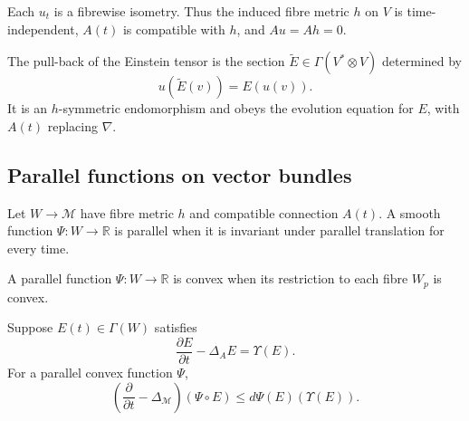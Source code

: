 \begin{remark}
\label{topping-ch9-uhlenbeck-metric}
Each \(u_t\) is a fibrewise isometry. Thus the induced fibre metric \(h\) on
\(V\) is time-independent, \(A(t)\) is compatible with \(h\), and
\(Au=Ah=0\).
\end{remark}

\begin{definition}
\label{topping-ch9-pulled-back-einstein}
The pull-back of the Einstein tensor is the section
\(\widetilde E\in\Gamma(V^*\otimes V)\) determined by
\[
u(\widetilde E(v))=E(u(v)).
\]
It is an \(h\)-symmetric endomorphism and obeys the evolution equation for
\(E\), with \(A(t)\) replacing \(\nabla\).
\end{definition}

\subsection{Parallel functions on vector bundles}

\begin{definition}
\label{topping-ch9-parallel-function}
Let \(W\to\mathcal M\) have fibre metric \(h\) and compatible connection
\(A(t)\). A smooth function \(\Psi:W\to\mathbb R\) is parallel when it is
invariant under parallel translation for every time.
\end{definition}

\begin{definition}
\label{topping-ch9-convex-parallel-function}
A parallel function \(\Psi:W\to\mathbb R\) is convex when its restriction
to each fibre \(W_p\) is convex.
\end{definition}

\begin{proposition}
\label{topping-ch9-parallel-composition-parabolic}

Suppose \(E(t)\in\Gamma(W)\) satisfies
\[
\frac{\partial E}{\partial t}-\Delta_AE=\Upsilon(E).
\]
For a parallel convex function \(\Psi\),
\[
\left(\frac{\partial}{\partial t}-\Delta_{\mathcal M}\right)(\Psi\circ E)
\le d\Psi(E)\!\left(\Upsilon(E)\right).
\]
\end{proposition}

